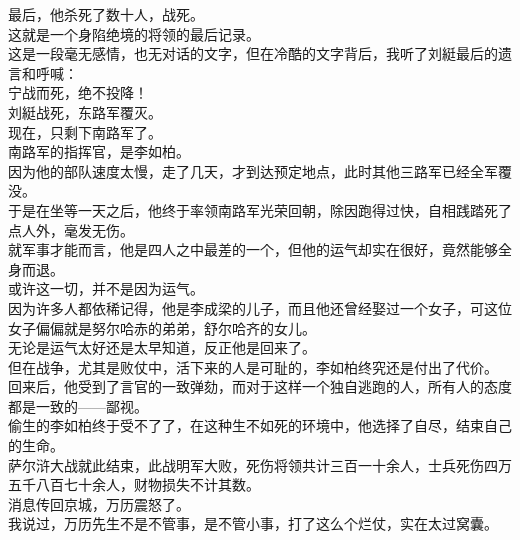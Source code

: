 \begin{multicols}{\theparacolNo}
最后，他杀死了数十人，战死。\\

这就是一个身陷绝境的将领的最后记录。\\

这是一段毫无感情，也无对话的文字，但在冷酷的文字背后，我听了刘綎最后的遗言和呼喊：\\

宁战而死，绝不投降！\\

刘綎战死，东路军覆灭。\\

现在，只剩下南路军了。\\

南路军的指挥官，是李如柏。\\

因为他的部队速度太慢，走了几天，才到达预定地点，此时其他三路军已经全军覆没。\\

于是在坐等一天之后，他终于率领南路军光荣回朝，除因跑得过快，自相践踏死了点人外，毫发无伤。\\

就军事才能而言，他是四人之中最差的一个，但他的运气却实在很好，竟然能够全身而退。\\

或许这一切，并不是因为运气。\\

因为许多人都依稀记得，他是李成梁的儿子，而且他还曾经娶过一个女子，可这位女子偏偏就是努尔哈赤的弟弟，舒尔哈齐的女儿。\\

无论是运气太好还是太早知道，反正他是回来了。\\

但在战争，尤其是败仗中，活下来的人是可耻的，李如柏终究还是付出了代价。\\

回来后，他受到了言官的一致弹劾，而对于这样一个独自逃跑的人，所有人的态度都是一致的——鄙视。\\

偷生的李如柏终于受不了了，在这种生不如死的环境中，他选择了自尽，结束自己的生命。\\

萨尔浒大战就此结束，此战明军大败，死伤将领共计三百一十余人，士兵死伤四万五千八百七十余人，财物损失不计其数。\\

消息传回京城，万历震怒了。\\

我说过，万历先生不是不管事，是不管小事，打了这么个烂仗，实在太过窝囊。\\


\end{multicols}
